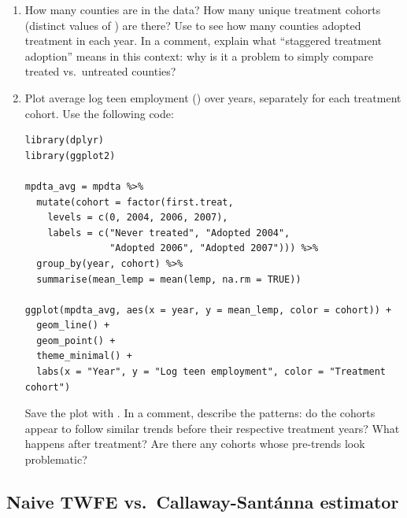 \begin{enumerate}[label=\alph*)]
  \item How many counties are in the data? How many unique treatment cohorts (distinct values of ) are there? Use  to see how many counties adopted treatment in each year. In a comment, explain what ``staggered treatment adoption'' means in this context: why is it a problem to simply compare treated vs.\ untreated counties?
  \item Plot average log teen employment () over years, separately for each treatment cohort. Use the following code:
  \begin{lstlisting}
library(dplyr)
library(ggplot2)

mpdta_avg = mpdta %>%
  mutate(cohort = factor(first.treat,
    levels = c(0, 2004, 2006, 2007),
    labels = c("Never treated", "Adopted 2004",
               "Adopted 2006", "Adopted 2007"))) %>%
  group_by(year, cohort) %>%
  summarise(mean_lemp = mean(lemp, na.rm = TRUE))

ggplot(mpdta_avg, aes(x = year, y = mean_lemp, color = cohort)) +
  geom_line() +
  geom_point() +
  theme_minimal() +
  labs(x = "Year", y = "Log teen employment", color = "Treatment cohort")
  \end{lstlisting}
  Save the plot with . In a comment, describe the patterns: do the cohorts appear to follow similar trends before their respective treatment years? What happens after treatment? Are there any cohorts whose pre-trends look problematic?
\end{enumerate}

\subsection{Naive TWFE vs.\ Callaway-Sant\'{a}nna estimator}

